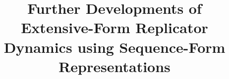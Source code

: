 \documentclass{aamas2014}
\begin{document}


\title{Further Developments of Extensive-Form Replicator Dynamics using Sequence-Form Representations}




%
%
%
%

%

\end{document}
